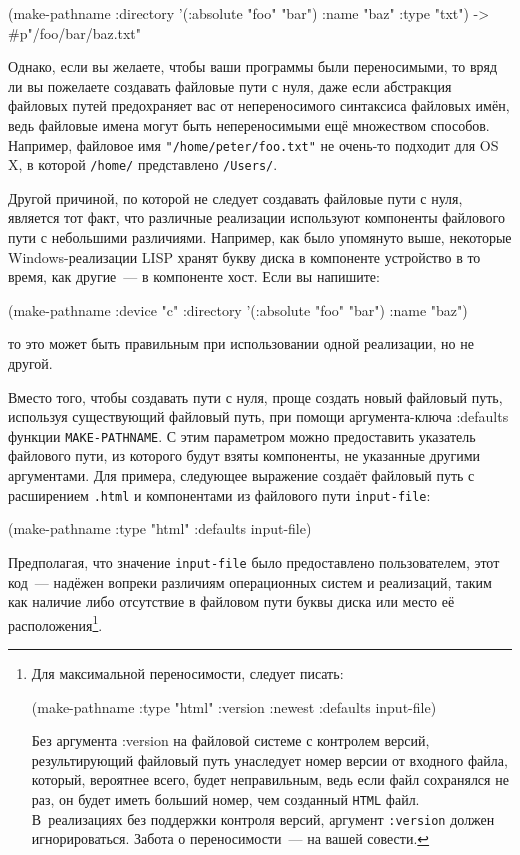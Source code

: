 \begin{myverb}
(make-pathname
  :directory '(:absolute "foo" "bar")
  :name "baz"
  :type "txt") ->  #p"/foo/bar/baz.txt"
\end{myverb}

Однако, если вы желаете, чтобы ваши программы были переносимыми, то вряд ли вы пожелаете
создавать файловые пути с нуля, даже если абстракция файловых путей предохраняет вас от
непереносимого синтаксиса файловых имён, ведь файловые имена могут быть непереносимыми ещё
множеством способов. Например, файловое имя \lstinline{"/home/peter/foo.txt"} не очень-то
подходит для OS X, в которой \lstinline{/home/} представлено \lstinline{/Users/}.

Другой причиной, по которой не следует создавать файловые пути с нуля, является тот факт,
что различные реализации используют компоненты файлового пути с небольшими
различиями. Например, как было упомянуто выше, некоторые Windows-реализации LISP хранят
букву диска в компоненте устройство в то время, как другие~--- в компоненте хост. Если вы
напишите:

\begin{myverb}
(make-pathname :device "c" :directory '(:absolute "foo" "bar") :name "baz") 
\end{myverb}

то это может быть правильным при использовании одной реализации, но не другой.

Вместо того, чтобы создавать пути с нуля, проще создать новый файловый путь, используя
существующий файловый путь, при помощи аргумента-ключа :defaults функции
\lstinline{MAKE-PATHNAME}. С этим параметром можно предоставить указатель файлового пути, из
которого будут взяты компоненты, не указанные другими аргументами. Для примера, следующее
выражение создаёт файловый путь с расширением \lstinline{.html} и компонентами из файлового
пути \lstinline{input-file}:

\begin{myverb}
(make-pathname :type "html" :defaults input-file) 
\end{myverb}

Предполагая, что значение \lstinline{input-file} было предоставлено пользователем, этот код~---
надёжен вопреки различиям операционных систем и реализаций, таким как наличие либо
отсутствие в файловом пути буквы диска или место её расположения\footnote{Для
  максимальной переносимости, следует писать:

\begin{myverb}
(make-pathname :type "html" :version :newest :defaults input-file) 
\end{myverb}

Без аргумента :version на файловой системе с контролем версий, результирующий файловый
путь унаследует номер версии от входного файла, который, вероятнее всего, будет
неправильным, ведь если файл сохранялся не раз, он будет иметь больший номер, чем
созданный \lstinline{HTML} файл. В~реализациях без поддержки контроля версий, аргумент
\lstinline{:version} должен игнорироваться. Забота о переносимости~--- на вашей совести.}\hspace{\footnotenegspace}.

